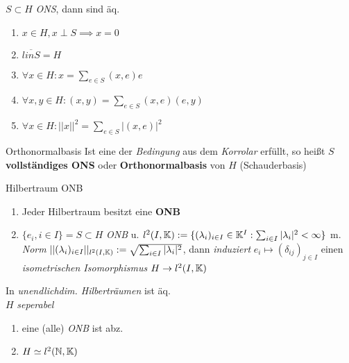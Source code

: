 \begin{korrolar}
  $S\subset H$ \textit{ONS}, dann sind äq.
  \begin{enumerate}[label = (\roman*)]
    \item $x\in H, x\perp S \implies x = 0$
    \item $\overline{linS} = H$
    \item $\forall x\in H: x = \sum_{e\in S}(x,e)e$
    \item $\forall x,y\in H: (x,y) = \sum_{e\in S}(x,e)(e,y)$
    \item $\forall x\in H: ||x||^2 = \sum_{e\in S}|(x,e)|^2$
  \end{enumerate}
\end{korrolar}

\begin{definition}{Orthonormalbasis}
  Ist eine der \textit{Bedingung} aus dem \textit{Korrolar} erfüllt, so heißt
  $S$ \textbf{vollständiges ONS} oder \textbf{Orthonormalbasis} von $H$
  (Schauderbasis)
\end{definition}

\begin{satz}{Hilbertraum ONB}
  \begin{enumerate}[label=(\roman*)]
    \item Jeder Hilbertraum besitzt eine \textbf{ONB}
    \item $\{e_i,i\in I\}=S\subset H$ \textit{ONB} u.
      $l^2(I,\mathbb{K}):=\{ (\lambda_i)_{i\in I}\in \mathbb{K}^I:
      \sum_{i\in I}|\lambda_i|^2 < \infty \}$ m. \textit{Norm}
      $||(\lambda_i)_{i\in I}||_{l^2(I,\mathbb{K})}
      :=\sqrt{\sum_{i\in I}|\lambda_i|^2}$,
      dann \textit{induziert} $e_i \mapsto (\delta_{ij})_{j\in I}$ einen
      \textit{isometrischen Isomorphismus} $H\to l^2(I,\mathbb{K})$
  \end{enumerate}
\end{satz}

\begin{bemerkung}
  In \textit{unendlichdim. Hilberträumen} ist äq.\\
  $H$ \textit{seperabel}
  \begin{enumerate}[label = $\Leftrightarrow$]
    \item eine (alle) \textit{ONB} ist abz.
    \item $H \simeq l^2(\mathbb{N},\mathbb{K})$
  \end{enumerate}
\end{bemerkung}
